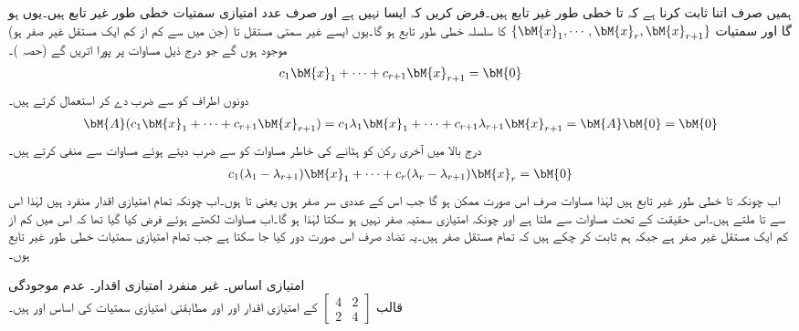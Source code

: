 ہمیں صرف اتنا ثابت کرنا ہے کہ  تا  خطی طور غیر تابع ہیں۔فرض کریں کہ ایسا نہیں ہے اور صرف  عدد امتیازی سمتیات خطی طور غیر تابع ہیں۔یوں  ہو گا اور  سمتیات
$\{\bM{x}_1, \cdots , \bM{x}_r,\bM{x}_{r+1}  \}$
کا سلسلہ خطی طور تابع ہو گا۔یوں ایسے غیر سمتی مستقل  تا  (جن میں سے کم از کم ایک مستقل غیر صفر ہو) موجود ہوں گے جو درج ذیل مساوات پر پورا اتریں گے (حصہ )۔
\begin{align}\label{مساوات_امتیازی_اساس_ثبوت_الف}
c_1\bM{x}_1+\cdots+c_{r+1}\bM{x}_{r+1}=\bM{0}
\end{align}  
دونوں اطراف کو  سے ضرب دے کر  استعمال کرتے ہیں۔
\begin{align}\label{مساوات_امتیازی_اساس_ثبوت_ب}
\bM{A}(c_1\bM{x}_1+\cdots+c_{r+1}\bM{x}_{r+1})=c_1\lambda_1\bM{x}_1+\cdots+c_{r+1}\lambda_{r+1}\bM{x}_{r+1}=\bM{A}\bM{0}=\bM{0}
\end{align}  
درج بالا میں آخری رکن کو ہٹانے کی خاطر مساوات  کو  سے ضرب دیتے ہوئے مساوات  سے منفی کرتے ہیں۔
\begin{align}\label{مساوات_امتیازی_اساس_ثبوت_پ}
c_1(\lambda_1-\lambda_{r+1})\bM{x}_1+\cdots+c_r(\lambda_r-\lambda_{r+1})\bM{x}_r=\bM{0}
\end{align}
اب چونکہ  تا  خطی طور غیر تابع ہیں لہٰذا مساوات  صرف اس صورت ممکن ہو گا جب اس کے عددی سر صفر ہوں یعنی  تا   ہوں۔اب چونکہ تمام امتیازی اقدار منفرد ہیں لہٰذا اس سے  تا  ملتے ہیں۔اس حقیقت کے تحت مساوات  سے  ملتا ہے اور چونکہ امتیازی سمتیہ صفر نہیں ہو سکتا لہٰذا  ہو گا۔اب  مساوات  لکھتے ہوئے فرض کیا گیا تھا کہ اس میں کم از کم ایک مستقل غیر صفر ہے جبکہ ہم ثابت کر چکے ہیں کہ تمام مستقل صفر ہیں۔یہ تضاد صرف اس صورت دور کیا جا سکتا ہے جب تمام امتیازی سمتیات خطی طور غیر تابع ہوں۔ 

\quad امتیازی اساس۔ غیر منفرد امتیازی اقدار۔ عدم موجودگی\\
قالب 
$ [\begin{smallmatrix}4&2\\2&4 \end{smallmatrix}]  $
کے امتیازی اقدار  اور  اور  مطابقتی امتیازی سمتیات کی اساس  اور  ہیں۔

